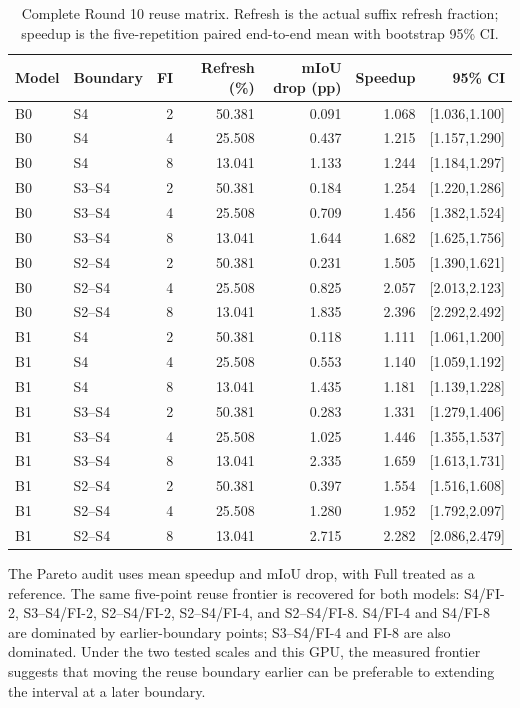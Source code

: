 \documentclass{article}
\begin{document}
\begin{table}[t]
\centering
\caption{Complete Round 10 reuse matrix. Refresh is the actual suffix refresh fraction; speedup is the five-repetition paired end-to-end mean with bootstrap 95\% CI.}
\label{tab:main}
\scriptsize
\setlength{\tabcolsep}{3.0pt}
\begin{tabular}{llrrrrr}
\toprule
Model & Boundary & FI & Refresh (\%) & mIoU drop (pp) & Speedup & 95\% CI \\
\midrule
B0 & S4 & 2 & 50.381 & 0.091 & 1.068 & [1.036,1.100] \\
B0 & S4 & 4 & 25.508 & 0.437 & 1.215 & [1.157,1.290] \\
B0 & S4 & 8 & 13.041 & 1.133 & 1.244 & [1.184,1.297] \\
B0 & S3--S4 & 2 & 50.381 & 0.184 & 1.254 & [1.220,1.286] \\
B0 & S3--S4 & 4 & 25.508 & 0.709 & 1.456 & [1.382,1.524] \\
B0 & S3--S4 & 8 & 13.041 & 1.644 & 1.682 & [1.625,1.756] \\
B0 & S2--S4 & 2 & 50.381 & 0.231 & 1.505 & [1.390,1.621] \\
B0 & S2--S4 & 4 & 25.508 & 0.825 & 2.057 & [2.013,2.123] \\
B0 & S2--S4 & 8 & 13.041 & 1.835 & 2.396 & [2.292,2.492] \\
\midrule
B1 & S4 & 2 & 50.381 & 0.118 & 1.111 & [1.061,1.200] \\
B1 & S4 & 4 & 25.508 & 0.553 & 1.140 & [1.059,1.192] \\
B1 & S4 & 8 & 13.041 & 1.435 & 1.181 & [1.139,1.228] \\
B1 & S3--S4 & 2 & 50.381 & 0.283 & 1.331 & [1.279,1.406] \\
B1 & S3--S4 & 4 & 25.508 & 1.025 & 1.446 & [1.355,1.537] \\
B1 & S3--S4 & 8 & 13.041 & 2.335 & 1.659 & [1.613,1.731] \\
B1 & S2--S4 & 2 & 50.381 & 0.397 & 1.554 & [1.516,1.608] \\
B1 & S2--S4 & 4 & 25.508 & 1.280 & 1.952 & [1.792,2.097] \\
B1 & S2--S4 & 8 & 13.041 & 2.715 & 2.282 & [2.086,2.479] \\
\bottomrule
\end{tabular}
\end{table}

The Pareto audit uses mean speedup and mIoU drop, with Full treated as a reference. The same five-point reuse frontier is recovered for both models: S4/FI-2, S3--S4/FI-2, S2--S4/FI-2, S2--S4/FI-4, and S2--S4/FI-8. S4/FI-4 and S4/FI-8 are dominated by earlier-boundary points; S3--S4/FI-4 and FI-8 are also dominated. Under the two tested scales and this GPU, the measured frontier suggests that moving the reuse boundary earlier can be preferable to extending the interval at a later boundary.
\end{document}
